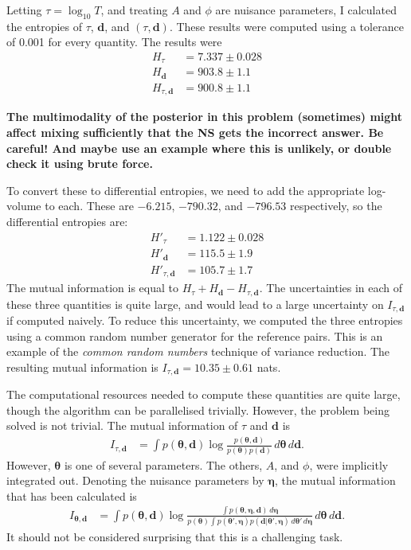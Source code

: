 \documentclass[entropy,article,submit,oneauthor,pdftex,10pt,a4paper]{mdpi}
\renewcommand{\d}{\boldsymbol{d}}
\newcommand{\query}{\color{green} \bf}
\newcommand{\x}{\boldsymbol{\theta}}
\newcommand{\n}{\boldsymbol{\eta}}
\begin{document}
Letting $\tau = \log_{10} T$, and treating
$A$ and $\phi$ are nuisance parameters, I calculated the entropies
of $\tau$, $\d$, and $(\tau, \d)$.
These results were computed using a tolerance of 0.001 for every quantity.
The results were
\begin{align}
H_{\tau}    &= 7.337 \pm 0.028 \\
H_{\d}      &= 903.8 \pm 1.1   \\
H_{\tau,\d} &= 900.8 \pm 1.1      %
\end{align}

{\query The multimodality of the posterior in this problem (sometimes) might
affect mixing sufficiently that the NS gets the incorrect answer. Be
careful! And maybe use an example where this is unlikely, or double
check it using brute force.}

To convert these to differential entropies, we need to add the appropriate
log-volume to each. These are $-6.215$, $-790.32$, and
$-796.53$ respectively, so the differential entropies are:
\begin{align}
H'_{\tau}     &= 1.122 \pm 0.028 \\
H'_{\d}       &= 115.5 \pm 1.9   \\
H'_{\tau, \d} &= 105.7 \pm 1.7
\end{align}
The mutual information is equal to $H_{\tau} + H_{\d} - H_{\tau, \d}$. The
uncertainties in each of these three quantities is quite large, and would lead
to a large uncertainty on $I_{\tau, \d}$ if computed naively. To reduce this
uncertainty, we computed the three entropies using a common random number
generator for the reference pairs. This is an example of the
{\em common random numbers} technique of variance reduction.
The resulting mutual information is
$I_{\tau, \d} = 10.35 \pm 0.61$ nats.


The computational resources needed to compute these quantities are quite large,
though the algorithm can be parallelised trivially. However, the problem
being solved is not trivial. The mutual information of $\tau$ and
$\d$ is
\begin{align}
I_{\tau, \d} &= \int p(\x, \d) \log\frac{p(\x, \d)}{p(\x)p(\d)} \, d\x \, d\d.
\end{align}
However, $\x$ is one of several parameters. The others, $A$, and $\phi$,
were implicitly integrated out. Denoting the nuisance parameters by
$\n$, the mutual information that has been calculated is
\begin{align}
I_{\x, \d} &= \int p(\x, \d)
  \log\frac{\int p(\x, \n, \d) \, d\n }
           {p(\x) \int p(\x', \n)p(\d | \x', \n) \, d\x' \, d\n}
  \, d\x \, d\d.
\end{align}
It should not be considered surprising that this is a challenging task.
\end{document}
